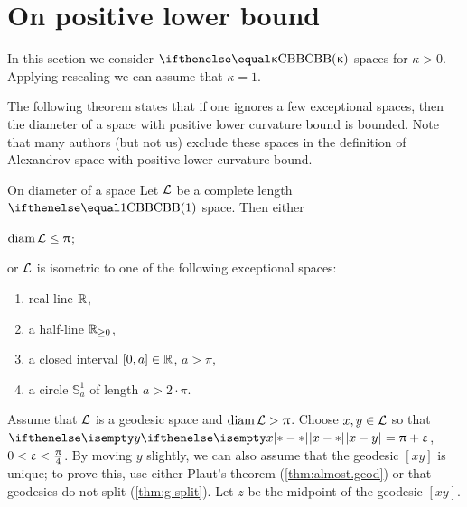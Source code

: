 
\section{On positive lower bound}\label{sec:positive.bound}

In this section we consider $\Alex{\kappa}$ spaces for $\kappa>0$.
Applying rescaling we can assume that $\kappa=1$.

The following theorem states that if one ignores a few exceptional spaces, then the diameter of a space with positive lower curvature bound is bounded.
Note that many authors (but not us) exclude these spaces in the definition of Alexandrov space with positive lower curvature bound.

\begin{thm}{On diameter of a space}\label{diam-k>0}
Let $\mathcal{L}$ be a complete length $\Alex1$ space. 
Then either 
\begin{subthm}{} $\diam \spc{L}\le \pi$; 
\end{subthm}

\begin{subthm}{} or $\mathcal{L}$ is isometric to one of the following exceptional spaces: 
\begin{enumerate}
\item real line $\mathbb{R}$,
\item a half-line $\RR_{\ge0}$,
\item a closed interval $[0,a]\in \RR$, $a>\pi$,
\item a circle $\mathbb{S}^1_a$ of length $a>2\cdot\pi$.
\end{enumerate}
\end{subthm}
\end{thm}


Assume that $\mathcal{L}$ is a geodesic space and $\mathop{\rm diam}\nolimits \mathcal{L}>\uppi$. 
Choose $x, y\in \spc{L}$ so that $\dist{x}{y}{}=\pi+\eps$, $0<\upvarepsilon<\tfrac{\uppi}{4}$. 
By moving $y$ slightly, we can also assume that the  geodesic $[x y]$ is unique;
to prove this, use either Plaut's theorem (\ref{thm:almost.geod}) 
or that  geodesics do not split (\ref{thm:g-split}).
Let $z$ be the midpoint of the geodesic $[x y]$.

